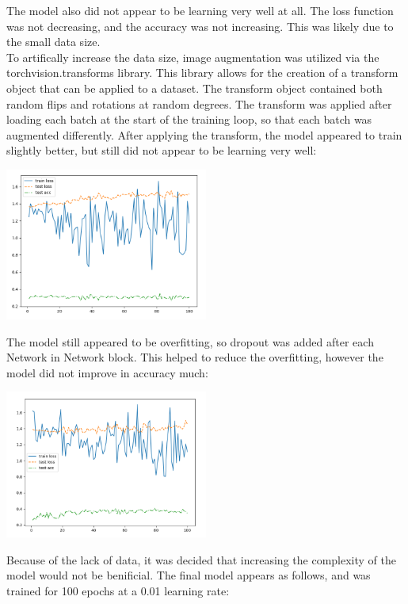 \documentclass{article}[12pt]
\begin{document}
\indent
The model also did not appear to be learning very well at all. The loss function was not decreasing, and the accuracy was not increasing. This was likely due to the small data size.\\

\indent
To artifically increase the data size, image augmentation was utilized via the torchvision.transforms library. This library allows for the creation of a transform object that can be applied to a dataset. The transform object contained both random flips and rotations at random degrees. The transform was applied after loading each batch at the start of the training loop, so that each batch was augmented differently. After applying the transform, the model appeared to train slightly better, but still did not appear to be learning very well:\\
\begin{center}
    \includegraphics[width=0.5\textwidth]{images/basic_model_augmented.png}
\end{center}
The model still appeared to be overfitting, so dropout was added after each Network in Network block. This helped to reduce the overfitting, however the model did not improve in accuracy much:\\
\begin{center}
    \includegraphics[width=0.5\textwidth]{images/model_augmented_dropout.png}
\end{center}
\indent
Because of the lack of data, it was decided that increasing the complexity of the model would not be benificial. The final model appears as follows, and was trained for 100 epochs at a 0.01 learning rate:\\
\end{document}
